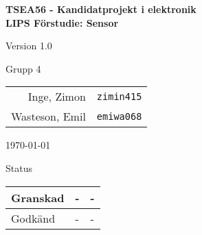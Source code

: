\documentclass[11pt]{article}
\begin{document}
\begin{titlepage}
\begin{center}

{\Large\bfseries TSEA56 - Kandidatprojekt i elektronik \\ LIPS Förstudie: Sensor}

\vspace{5em}

Version 1.0

\vspace{5em}
Grupp 4 \\
\begin{tabular}{rl}
Inge, Zimon&\verb+zimin415+
\\
Wasteson, Emil&\verb+emiwa068+
\\

\end{tabular}

\vspace{5em}
\today

\vspace{16em}
Status
\begin{longtable}{|l|l|l|} \hline

Granskad & - & - \\ \hline
Godkänd & - & - \\ \hline
 
\end{longtable}


\end{center}
\end{titlepage}
\end{document}
